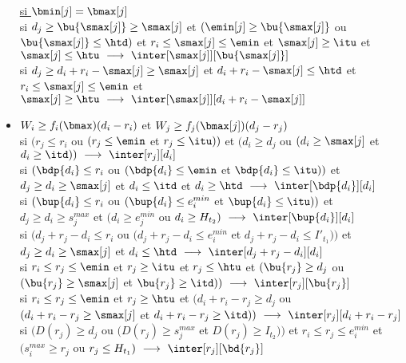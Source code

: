 \documentclass{report}
\begin{document}
\begin{itemize}
  \underline{si $\bmin[j]=\bmax[j]$}\\
  \vspace{0.2cm}
  si $d_j \ge \bu{\smax[j]} \ge \smax[j]$ et 
  $(\emin[j] \ge \bu{\smax[j]}$ ou $\bu{\smax[j]} \le \htd)$ et 
  $r_i \le \smax[j] \le \emin$ et $\smax[j] \ge \itu$ et 
  $\smax[j] \le \htu\ \longrightarrow\ 
  \inter[{\smax[j]}][\bu{\smax[j]}]$\\
  \vspace{0.1cm}
  si $d_j \ge d_i+r_i-\smax[j] \ge \smax[j]$ et $ d_i+r_i-\smax[j] \le \htd$ et 
  $r_i \le \smax[j] \le \emin$ et 
  $\smax[j] \ge \htu\ \longrightarrow\ \inter[{\smax[j]}][{d_i+r_i-\smax[j]}]$\\


  \vspace{0.5cm} 

\item $W_i\ge f_i(\bmax)(d_i-r_i)$ et $W_j \ge f_j(\bmax[j])(d_j-r_j)$\\
  \vspace{0.2cm}
  si $(r_j \le r_i$ ou $(r_j \le \emin$ et $r_j \le \itu))$ et 
  $(d_i \ge d_j$ ou $(d_i \ge \smax[j]$ et $d_i \ge \itd))\ 
  \longrightarrow\ \inter[r_j][d_i]$\\
  \vspace{0.1cm}
  si $(\bdp{d_i} \le r_i$ ou $(\bdp{d_i}\le \emin$ et $\bdp{d_i}\le \itu))$ et $d_j \ge d_i \ge \smax[j]$ et $d_i \le \itd$ et $d_i \ge \htd\ \longrightarrow\ 
  \inter[\bdp{d_i}][d_i]$\\
  \vspace{0.1cm}
  si $(\bup{d_i} \le r_i$ ou $(\bup{d_i} \le e_i^{min}$ et $\bup{d_i} \le \itu))$ et $d_j \ge d_i \ge s_j^{max}$ 
  et $(d_i \ge e_j^{min}$ ou $d_i \ge H_{t_2})\ \longrightarrow\ 
  \inter[\bup{d_i}][d_i]$\\
  \vspace{0.1cm}
  si $(d_j+r_j-d_i \le r_i$ ou $(d_j+r_j-d_i \le e_i^{min}$ et $d_j+r_j-d_i \le I'_{t_1}))$ et $d_j \ge d_i \ge \smax[j]$ et 
  $d_i\le \htd\ \longrightarrow\ \inter[d_j+r_j-d_i][d_i]$\\
  \vspace{0.1cm}
  si $r_i \le r_j \le \emin$ et $r_j \ge \itu$ et $r_j \le \htu$ et   
  $(\bu{r_j} \ge d_j$ ou $(\bu{r_j} \ge \smax[j]$ et    
  $\bu{r_j} \ge \itd))\ \longrightarrow\ \inter[r_j][\bu{r_j}]$\\
  \vspace{0.1cm}
  si $r_i \le r_j \le \emin$ et $r_j \ge \htu$ et 
  $(d_i+r_i-r_j \ge d_j$ ou $(d_i+r_i-r_j \ge \smax[j]$ et   
  $d_i+r_i-r_j \ge \itd))\ \longrightarrow\ \inter[r_j][d_i+r_i-r_j]$\\
  \vspace{0.1cm}
  si $(D(r_j) \ge d_j$ ou $(D(r_j) 
  \ge s_j^{max}$ et $D(r_j) \ge I_{t_2}))$ et $r_i \le r_j \le e_i^{min}$ et $(s_i^{max} \ge r_j$ ou $r_j \le H_{t_1})\ \longrightarrow\ \inter[r_j][\bd{r_j}]$\\
\end{itemize}
\end{document}
